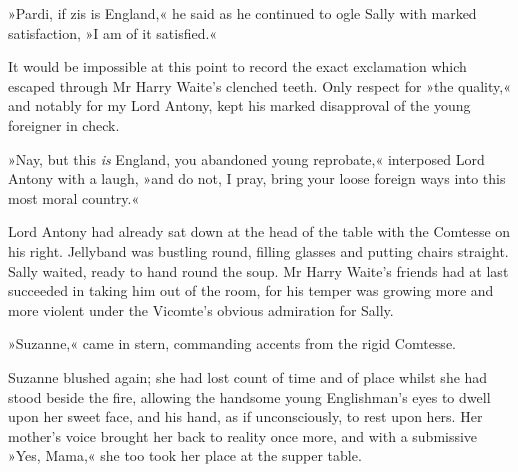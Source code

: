 »Pardi, if zis is England,« he said as he continued to ogle Sally with marked satisfaction, »I am of it satisfied.«

It would be impossible at this point to record the exact exclamation which escaped through Mr Harry Waite's clenched teeth. Only respect for »the quality,« and notably for my Lord Antony, kept his marked disapproval of the young foreigner in check.

»Nay, but this \textit{is} England, you abandoned young reprobate,« interposed Lord Antony with a laugh, »and do not, I pray, bring your loose foreign ways into this most moral country.«

Lord Antony had already sat down at the head of the table with the Comtesse on his right. Jellyband was bustling round, filling glasses and putting chairs straight. Sally waited, ready to hand round the soup. Mr Harry Waite's friends had at last succeeded in taking him out of the room, for his temper was growing more and more violent under the Vicomte's obvious admiration for Sally.

»Suzanne,« came in stern, commanding accents from the rigid Comtesse.

Suzanne blushed again; she had lost count of time and of place whilst she had stood beside the fire, allowing the handsome young Englishman's eyes to dwell upon her sweet face, and his hand, as if unconsciously, to rest upon hers. Her mother's voice brought her back to reality once more, and with a submissive »Yes, Mama,« she too took her place at the supper table.
